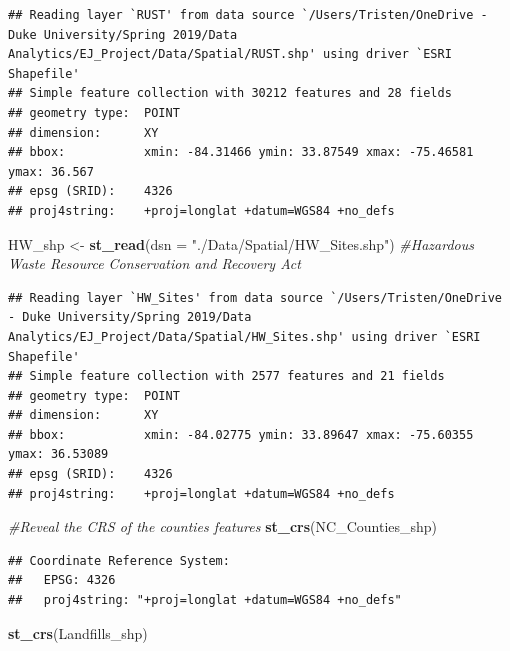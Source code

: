 \documentclass[12pt,]{article}
\newenvironment{Shaded}{\begin{snugshade}}{\end{snugshade}}
\newcommand{\KeywordTok}[1]{\textcolor[rgb]{0.13,0.29,0.53}{\textbf{#1}}}
\newcommand{\DataTypeTok}[1]{\textcolor[rgb]{0.13,0.29,0.53}{#1}}
\newcommand{\StringTok}[1]{\textcolor[rgb]{0.31,0.60,0.02}{#1}}
\newcommand{\CommentTok}[1]{\textcolor[rgb]{0.56,0.35,0.01}{\textit{#1}}}
\newcommand{\NormalTok}[1]{#1}
\begin{document}
\begin{verbatim}
## Reading layer `RUST' from data source `/Users/Tristen/OneDrive - Duke University/Spring 2019/Data Analytics/EJ_Project/Data/Spatial/RUST.shp' using driver `ESRI Shapefile'
## Simple feature collection with 30212 features and 28 fields
## geometry type:  POINT
## dimension:      XY
## bbox:           xmin: -84.31466 ymin: 33.87549 xmax: -75.46581 ymax: 36.567
## epsg (SRID):    4326
## proj4string:    +proj=longlat +datum=WGS84 +no_defs
\end{verbatim}

\begin{Shaded}
\begin{Highlighting}[]
\NormalTok{HW_shp <-}\StringTok{ }\KeywordTok{st_read}\NormalTok{(}\DataTypeTok{dsn =} \StringTok{"./Data/Spatial/HW_Sites.shp"}\NormalTok{) }\CommentTok{#Hazardous Waste Resource Conservation and Recovery Act}
\end{Highlighting}
\end{Shaded}

\begin{verbatim}
## Reading layer `HW_Sites' from data source `/Users/Tristen/OneDrive - Duke University/Spring 2019/Data Analytics/EJ_Project/Data/Spatial/HW_Sites.shp' using driver `ESRI Shapefile'
## Simple feature collection with 2577 features and 21 fields
## geometry type:  POINT
## dimension:      XY
## bbox:           xmin: -84.02775 ymin: 33.89647 xmax: -75.60355 ymax: 36.53089
## epsg (SRID):    4326
## proj4string:    +proj=longlat +datum=WGS84 +no_defs
\end{verbatim}

\begin{Shaded}
\begin{Highlighting}[]
\CommentTok{#Reveal the CRS of the counties features}
\KeywordTok{st_crs}\NormalTok{(NC_Counties_shp)}
\end{Highlighting}
\end{Shaded}

\begin{verbatim}
## Coordinate Reference System:
##   EPSG: 4326 
##   proj4string: "+proj=longlat +datum=WGS84 +no_defs"
\end{verbatim}

\begin{Shaded}
\begin{Highlighting}[]
\KeywordTok{st_crs}\NormalTok{(Landfills_shp)}
\end{Highlighting}
\end{Shaded}
\end{document}
